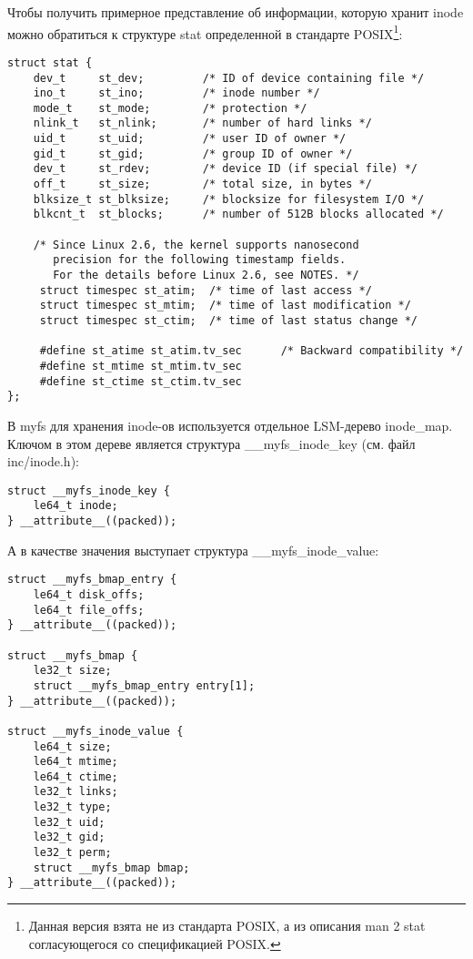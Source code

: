 Чтобы получить примерное представление об информации, которую хранит inode можно
обратиться к структуре stat определенной в стандарте POSIX\footnote{Данная
версия взята не из стандарта POSIX, а из описания man 2 stat согласующегося со
спецификацией POSIX.}:
\begin{lstlisting}
struct stat {
    dev_t     st_dev;         /* ID of device containing file */
    ino_t     st_ino;         /* inode number */
    mode_t    st_mode;        /* protection */
    nlink_t   st_nlink;       /* number of hard links */
    uid_t     st_uid;         /* user ID of owner */
    gid_t     st_gid;         /* group ID of owner */
    dev_t     st_rdev;        /* device ID (if special file) */
    off_t     st_size;        /* total size, in bytes */
    blksize_t st_blksize;     /* blocksize for filesystem I/O */
    blkcnt_t  st_blocks;      /* number of 512B blocks allocated */

    /* Since Linux 2.6, the kernel supports nanosecond
       precision for the following timestamp fields.
       For the details before Linux 2.6, see NOTES. */
     struct timespec st_atim;  /* time of last access */
     struct timespec st_mtim;  /* time of last modification */
     struct timespec st_ctim;  /* time of last status change */

     #define st_atime st_atim.tv_sec      /* Backward compatibility */
     #define st_mtime st_mtim.tv_sec
     #define st_ctime st_ctim.tv_sec
};
\end{lstlisting}


В myfs для хранения inode-ов используется отдельное LSM-дерево inode\_map.
Ключом в этом дереве является структура \_\_myfs\_inode\_key (см. файл
inc/inode.h):
\begin{lstlisting}
struct __myfs_inode_key {
    le64_t inode;
} __attribute__((packed));
\end{lstlisting}

А в качестве значения выступает структура \_\_myfs\_inode\_value:
\begin{lstlisting}
struct __myfs_bmap_entry {
    le64_t disk_offs;
    le64_t file_offs;
} __attribute__((packed));

struct __myfs_bmap {
    le32_t size;
    struct __myfs_bmap_entry entry[1];
} __attribute__((packed));

struct __myfs_inode_value {
    le64_t size;
    le64_t mtime;
    le64_t ctime;
    le32_t links;
    le32_t type;
    le32_t uid;
    le32_t gid;
    le32_t perm;
    struct __myfs_bmap bmap;
} __attribute__((packed));
\end{lstlisting}

